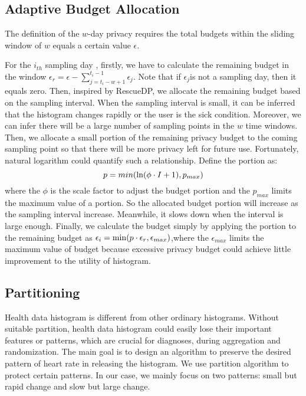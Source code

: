 \documentclass[10pt,conference]{IEEEtran}
\begin{document}
\subsection{Adaptive Budget Allocation}
The definition of the $w$-day privacy requires the total budgets within the sliding window of $w$ equals a certain value $\epsilon$. 

For the $i_{th}$ sampling day , firstly, we have to calculate the remaining budget in the window $\epsilon_r=\epsilon-\sum_{j=t_i-w+1}^{t_i-1}\epsilon_j$. Note that if $\epsilon_j$is not a sampling day, then it equals zero. Then, inspired by RescueDP, we allocate the remaining budget based on the sampling interval. When the sampling interval is small, it can be inferred that the histogram changes rapidly or the user is the sick condition. Moreover, we can infer there will be a large number of sampling points in the $w$ time windows. Then, we allocate a small portion of the remaining privacy budget to the coming sampling point so that there will be more privacy left for future use. Fortunately, natural logarithm could quantify such a relationship. Define the portion as:
\begin{equation}\label{portion}
p =min({\rm ln}(\phi \cdot I+1),p_{max})
\end{equation}
where the $\phi$ is the scale factor to adjust the budget portion and the $p_{max}$ limits the maximum value of a portion. So the allocated budget portion will increase as the sampling interval increase. Meanwhile, it slows down when the interval is large enough. Finally, we calculate the budget simply by applying the portion to the remaining budget as $\epsilon_i={\rm min}(p \cdot \epsilon_r,\epsilon_{max})$,where the $\epsilon_{max}$ limits the maximum value of budget because excessive privacy budget could achieve little improvement to the utility of histogram.


\subsection{Partitioning}
Health data histogram is different from other ordinary histograms. Without suitable partition, health data histogram could easily lose their important features or patterns, which are crucial for diagnoses, during aggregation and randomization. The main goal is to design an algorithm to preserve the desired pattern of heart rate in releasing the histogram. We use partition algorithm to protect certain patterns. In our case, we mainly focus on two patterns: small but rapid change and slow but large change.
\end{document}
